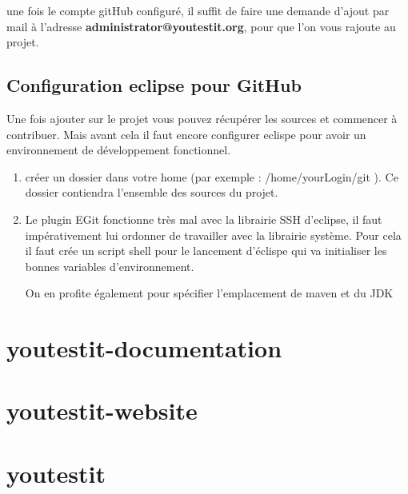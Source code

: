 une fois le compte gitHub configuré, il suffit de faire une demande d'ajout par mail à l'adresse
\textbf{administrator@youtestit.org}, pour que l'on vous rajoute au projet.

\subsection{Configuration eclipse pour GitHub}
Une fois ajouter sur le projet  vous pouvez récupérer les sources et commencer à contribuer. 
Mais avant cela il faut encore configurer eclispe pour avoir un environnement de développement
fonctionnel. 

\begin{enumerate}
	\item créer un dossier dans votre home (par exemple : /home/yourLogin/git ). Ce dossier contiendra
	 l'ensemble des sources du projet.
	 
	 \item Le plugin EGit fonctionne très mal avec la librairie SSH d'eclipse, il faut impérativement lui
	 ordonner de travailler avec la librairie système. Pour cela il faut  crée un script shell pour le lancement
	 d'éclispe qui va initialiser les bonnes variables d'environnement.
	 
	 
	On en profite également pour spécifier l'emplacement de maven et du JDK

\end{enumerate}

\section{youtestit-documentation}


\section{youtestit-website}	


\section{youtestit}

